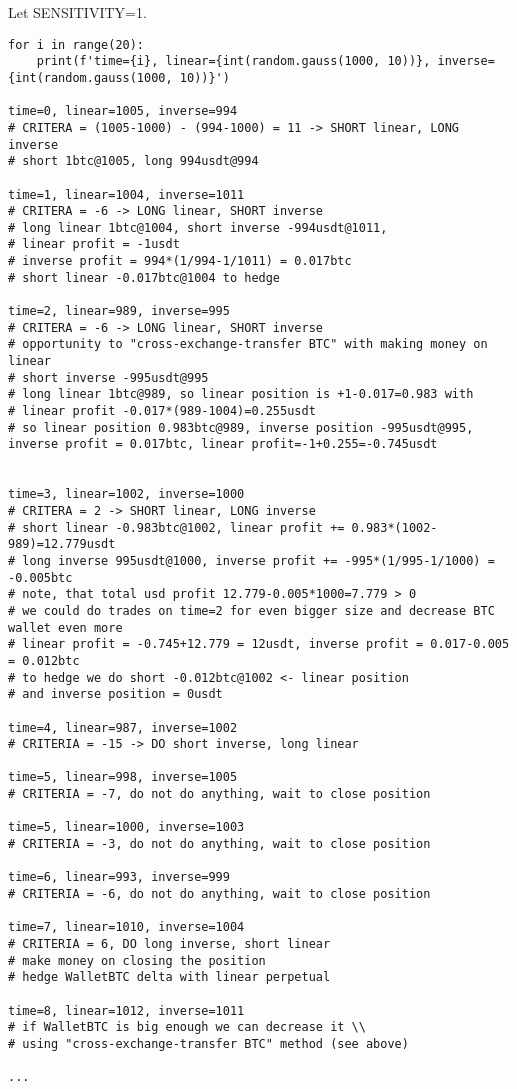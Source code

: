 \documentclass{article}
\begin{document}
Let SENSITIVITY=1.

\begin{lstlisting}
for i in range(20):
    print(f'time={i}, linear={int(random.gauss(1000, 10))}, inverse={int(random.gauss(1000, 10))}')

time=0, linear=1005, inverse=994
# CRITERA = (1005-1000) - (994-1000) = 11 -> SHORT linear, LONG inverse
# short 1btc@1005, long 994usdt@994

time=1, linear=1004, inverse=1011
# CRITERA = -6 -> LONG linear, SHORT inverse
# long linear 1btc@1004, short inverse -994usdt@1011,  
# linear profit = -1usdt
# inverse profit = 994*(1/994-1/1011) = 0.017btc
# short linear -0.017btc@1004 to hedge

time=2, linear=989, inverse=995
# CRITERA = -6 -> LONG linear, SHORT inverse
# opportunity to "cross-exchange-transfer BTC" with making money on linear
# short inverse -995usdt@995
# long linear 1btc@989, so linear position is +1-0.017=0.983 with 
# linear profit -0.017*(989-1004)=0.255usdt
# so linear position 0.983btc@989, inverse position -995usdt@995, inverse profit = 0.017btc, linear profit=-1+0.255=-0.745usdt


time=3, linear=1002, inverse=1000
# CRITERA = 2 -> SHORT linear, LONG inverse
# short linear -0.983btc@1002, linear profit += 0.983*(1002-989)=12.779usdt
# long inverse 995usdt@1000, inverse profit += -995*(1/995-1/1000) = -0.005btc
# note, that total usd profit 12.779-0.005*1000=7.779 > 0
# we could do trades on time=2 for even bigger size and decrease BTC wallet even more
# linear profit = -0.745+12.779 = 12usdt, inverse profit = 0.017-0.005 = 0.012btc
# to hedge we do short -0.012btc@1002 <- linear position
# and inverse position = 0usdt

time=4, linear=987, inverse=1002
# CRITERIA = -15 -> DO short inverse, long linear

time=5, linear=998, inverse=1005
# CRITERIA = -7, do not do anything, wait to close position

time=5, linear=1000, inverse=1003
# CRITERIA = -3, do not do anything, wait to close position

time=6, linear=993, inverse=999
# CRITERIA = -6, do not do anything, wait to close position

time=7, linear=1010, inverse=1004
# CRITERIA = 6, DO long inverse, short linear
# make money on closing the position
# hedge WalletBTC delta with linear perpetual

time=8, linear=1012, inverse=1011
# if WalletBTC is big enough we can decrease it \\
# using "cross-exchange-transfer BTC" method (see above)

...
\end{lstlisting}
\end{document}
